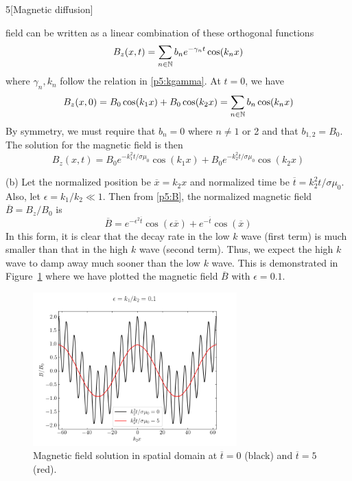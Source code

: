 \documentclass[12pt]{article}
\begin{document}
\begin{problem}{5}[Magnetic diffusion]
\begin{solution}
    field can be written as a linear combination of these orthogonal functions
    \begin{equation}
        B_z(x,t)=\sum_{n\in\mathbb{N}}b_ne^{-\gamma_nt}\cos(k_nx)
    \end{equation}
    where $\gamma_n,k_n$ follow the relation in \eqref{p5:kgamma}. At $t=0$, we
    have
    \begin{equation}
        B_z(x,0)=B_0\cos(k_1x)+B_0\cos(k_2x)=\sum_{n\in\mathbb{N}}b_n\cos(k_nx) 
    \end{equation}
    By symmetry, we must require that $b_n=0$ where $n\neq1$ or 2 and that
    $b_{1,2}=B_0$. The solution for the magnetic field is then
    \begin{equation}\label{p5:B}
        B_z(x,t)=B_0e^{-k_1^2t/\sigma\mu_0}\cos(k_1x)+B_0e^{-k_2^2t/\sigma\mu_0}\cos(k_2x) 
    \end{equation}

    (b) Let the normalized position be $\overline{x}=k_2x$ and normalized time
    be $\overline{t}=k_2^2t/\sigma\mu_0$. Also, let $\epsilon=k_1/k_2\ll1$. Then
    from \eqref{p5:B}, the normalized magnetic field $\overline{B}=B_z/B_0$ is
    \begin{equation}
        \overline{B}=e^{-\epsilon^2\overline{t}}\cos(\epsilon\overline{x})+e^{-\overline{t}}\cos(\overline{x}) 
    \end{equation}
    In this form, it is clear that the decay rate in the low $k$ wave (first
    term) is much smaller than that in the high $k$ wave (second term). Thus, 
    we expect the high $k$ wave to damp away much sooner than the low $k$ wave. 
    This is demonstrated in Figure~\ref{fig:p5} where we have plotted the 
    magnetic field $\overline{B}$ with $\epsilon=0.1$.
    \begin{figure}[h]
        \centering
        \includegraphics[width=0.7\textwidth]{p5.png}
        \caption{Magnetic field solution in spatial domain at
        $\overline{t}=0$ (black) and $\overline{t}=5$ (red).}
        \label{fig:p5}
    \end{figure}
\end{solution}
\end{problem}
\end{document}
